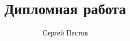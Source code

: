 
\thispagestyle{empty}

\title{Дипломная работа}
\author{Сергей Пестов}
\maketitle

\tableofcontents



